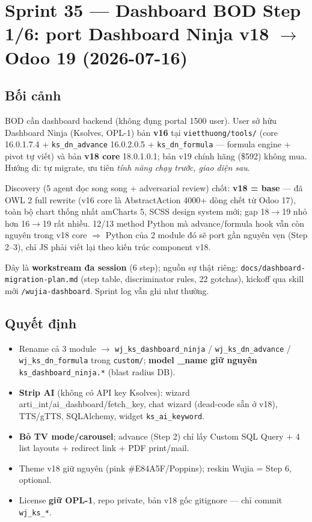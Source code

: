 \chapter{Sprint 35 --- Dashboard BOD Step 1/6: port Dashboard Ninja v18 $\to$ Odoo 19 (2026-07-16)}

\section{Bối cảnh}

BOD cần dashboard backend (không đụng portal 1500 user). User sở hữu Dashboard Ninja
(Ksolves, OPL-1) bản \textbf{v16} tại \texttt{vietthuong/tools/} (core 16.0.1.7.4 +
\texttt{ks\_dn\_advance} 16.0.2.0.5 + \texttt{ks\_dn\_formula} --- formula engine + pivot
tự viết) và bản \textbf{v18 core} 18.0.1.0.1; bản v19 chính hãng (\$592) không mua.
Hướng đi: tự migrate, ưu tiên \emph{tính năng chạy trước, giao diện sau}.

Discovery (5 agent đọc song song + adversarial review) chốt: \textbf{v18 = base}
--- đã OWL 2 full rewrite (v16 core là AbstractAction 4000+ dòng chết từ Odoo 17),
toàn bộ chart thống nhất amCharts 5, SCSS design system mới; gap 18$\to$19 nhỏ hơn 16$\to$19
rất nhiều. 12/13 method Python mà advance/formula hook vẫn còn nguyên trong v18 core
$\Rightarrow$ Python của 2 module đó sẽ port gần nguyên vẹn (Step 2--3), chỉ JS phải viết
lại theo kiến trúc component v18.

Đây là \textbf{workstream đa session} (6 step); nguồn sự thật riêng:
\texttt{docs/dashboard-migration-plan.md} (step table, discriminator rules, 22 gotchas),
kickoff qua skill mới \texttt{/wujia-dashboard}. Sprint log vẫn ghi như thường.

\section{Quyết định}

\begin{itemize}
  \item Rename cả 3 module $\to$ \texttt{wj\_ks\_dashboard\_ninja} / \texttt{wj\_ks\_dn\_advance}
    / \texttt{wj\_ks\_dn\_formula} trong \texttt{custom/}; \textbf{model \_name giữ nguyên}
    \texttt{ks\_dashboard\_ninja.*} (blast radius DB).
  \item \textbf{Strip AI} (không có API key Ksolves): wizard arti\_int/ai\_dashboard/fetch\_key,
    chat wizard (dead-code sẵn ở v18), TTS/gTTS, SQLAlchemy, widget \texttt{ks\_ai\_keyword}.
  \item \textbf{Bỏ TV mode/carousel}; advance (Step 2) chỉ lấy Custom SQL Query + 4 list
    layouts + redirect link + PDF print/mail.
  \item Theme v18 giữ nguyên (pink \#E84A5F/Poppins); reskin Wujia = Step 6, optional.
  \item License \textbf{giữ OPL-1}, repo private, bản v18 gốc gitignore --- chỉ commit \texttt{wj\_ks\_*}.
\end{itemize}

